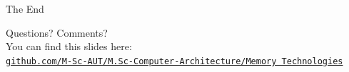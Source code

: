 \documentclass[
	12pt, %
]{beamer}
\begin{document}
\begin{frame}[plain] %
	\begin{center}
		{\Huge The End}
		
		\bigskip\bigskip %
		
		{\LARGE Questions? Comments?}\\
		You can find this slides here:\\
		\textcolor{blue}{\href{https://github.com/M-Sc-AUT/M.Sc-Computer-Architecture/tree/main/Memory Technologies}{\texttt{github.com/M-Sc-AUT/M.Sc-Computer-Architecture/Memory Technologies}}}
	\end{center}
\end{frame}

\end{document}
